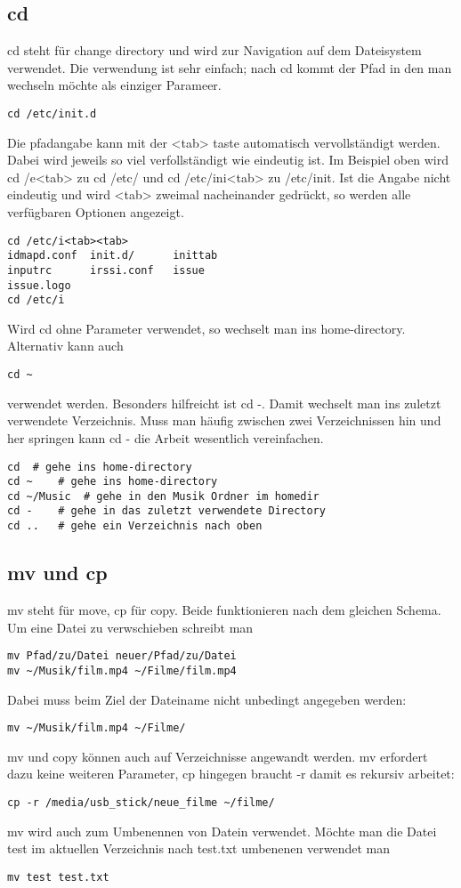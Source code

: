 \subsection{cd}
cd steht f\"ur change directory und wird zur Navigation auf dem Dateisystem verwendet. Die verwendung ist sehr einfach; nach cd kommt der Pfad in den man wechseln m\"ochte als einziger Parameer.
\begin{lstlisting}
cd /etc/init.d
\end{lstlisting}
Die pfadangabe kann mit der <tab> taste automatisch vervollst\"andigt werden. Dabei wird jeweils so viel verfollst\"andigt wie eindeutig ist. Im Beispiel oben wird cd /e<tab> zu cd /etc/ und cd /etc/ini<tab> zu /etc/init. Ist die Angabe nicht eindeutig und wird <tab> zweimal nacheinander gedr\"uckt, so werden alle verf\"ugbaren Optionen angezeigt.
\begin{lstlisting}
cd /etc/i<tab><tab>
idmapd.conf  init.d/      inittab
inputrc      irssi.conf   issue
issue.logo
cd /etc/i
\end{lstlisting}
Wird cd ohne Parameter verwendet, so wechselt man ins home-directory. Alternativ kann auch
\begin{lstlisting}
cd ~
\end{lstlisting}
verwendet werden. Besonders hilfreicht ist cd -. Damit wechselt man ins zuletzt verwendete Verzeichnis. Muss man h\"aufig zwischen zwei Verzeichnissen hin und her springen kann cd - die Arbeit wesentlich vereinfachen.
\begin{lstlisting}
cd	# gehe ins home-directory
cd ~	# gehe ins home-directory
cd ~/Music	# gehe in den Musik Ordner im homedir
cd -	# gehe in das zuletzt verwendete Directory
cd ..	# gehe ein Verzeichnis nach oben
\end{lstlisting}
\subsection{mv und cp}
mv steht f\"ur move, cp f\"ur copy. Beide funktionieren nach dem gleichen Schema. Um eine Datei zu verwschieben schreibt man
\begin{lstlisting}
mv Pfad/zu/Datei neuer/Pfad/zu/Datei
mv ~/Musik/film.mp4 ~/Filme/film.mp4
\end{lstlisting}
Dabei muss beim Ziel der Dateiname nicht unbedingt angegeben werden:
\begin{lstlisting}
mv ~/Musik/film.mp4 ~/Filme/
\end{lstlisting}
mv und copy k\"onnen auch auf Verzeichnisse angewandt werden. mv erfordert dazu keine weiteren Parameter, cp hingegen braucht -r damit es rekursiv arbeitet:
\begin{lstlisting}
cp -r /media/usb_stick/neue_filme ~/filme/
\end{lstlisting}
mv wird auch zum Umbenennen von Datein verwendet. M\"ochte man die Datei test im aktuellen Verzeichnis nach test.txt umbenenen verwendet man
\begin{lstlisting}
mv test test.txt
\end{lstlisting}
